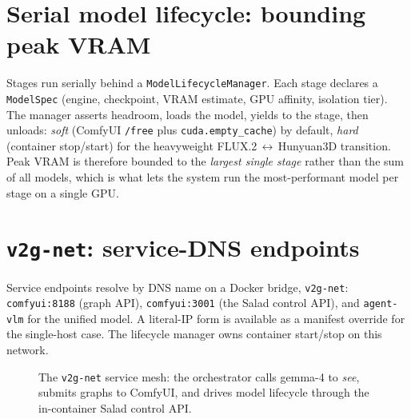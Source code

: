 \documentclass[a4paper,11pt]{report}
\newcommand{\code}[1]{\texttt{#1}}
\begin{document}
\section{Serial model lifecycle: bounding peak VRAM}
Stages run serially behind a \code{ModelLifecycleManager}. Each stage declares a \code{ModelSpec}
(engine, checkpoint, VRAM estimate, GPU affinity, isolation tier). The manager asserts headroom, loads
the model, yields to the stage, then unloads: \emph{soft} (ComfyUI \code{/free} plus
\code{cuda.empty\_cache}) by default, \emph{hard} (container stop/start) for the heavyweight
FLUX.2\,$\leftrightarrow$\,Hunyuan3D transition. Peak VRAM is therefore bounded to the \emph{largest
single stage} rather than the sum of all models, which is what lets the system run the most-performant
model per stage on a single GPU.

\section{\texttt{v2g-net}: service-DNS endpoints}
Service endpoints resolve by DNS name on a Docker bridge, \code{v2g-net}: \code{comfyui:8188} (graph
API), \code{comfyui:3001} (the Salad control API), and \code{agent-vlm} for the unified model. A
literal-IP form is available as a manifest override for the single-host case. The lifecycle manager owns
container start/stop on this network.

\begin{figure}[h]
\centering
{}
\caption{The \code{v2g-net} service mesh: the orchestrator calls gemma-4 to \emph{see}, submits graphs
to ComfyUI, and drives model lifecycle through the in-container Salad control API.}\label{fig:mesh}
\end{figure}
\end{document}
